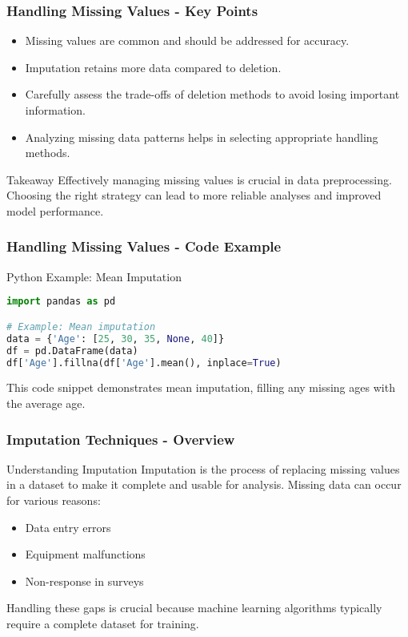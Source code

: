 \documentclass[aspectratio=169]{beamer}
\begin{document}
\begin{frame}[fragile]
    \frametitle{Handling Missing Values - Key Points}
    \begin{itemize}
        \item Missing values are common and should be addressed for accuracy.
        \item Imputation retains more data compared to deletion.
        \item Carefully assess the trade-offs of deletion methods to avoid losing important information.
        \item Analyzing missing data patterns helps in selecting appropriate handling methods.
    \end{itemize}
    
    \begin{block}{Takeaway}
        Effectively managing missing values is crucial in data preprocessing. Choosing the right strategy can lead to more reliable analyses and improved model performance.
    \end{block}
\end{frame}

\begin{frame}[fragile]
    \frametitle{Handling Missing Values - Code Example}
    \begin{block}{Python Example: Mean Imputation}
        \begin{lstlisting}[language=Python]
import pandas as pd

# Example: Mean imputation
data = {'Age': [25, 30, 35, None, 40]}
df = pd.DataFrame(data)
df['Age'].fillna(df['Age'].mean(), inplace=True)
        \end{lstlisting}
        This code snippet demonstrates mean imputation, filling any missing ages with the average age.
    \end{block}
\end{frame}

\begin{frame}[fragile]
    \frametitle{Imputation Techniques - Overview}
    \begin{block}{Understanding Imputation}
        Imputation is the process of replacing missing values in a dataset to make it complete and usable for analysis. Missing data can occur for various reasons:
        \begin{itemize}
            \item Data entry errors
            \item Equipment malfunctions
            \item Non-response in surveys
        \end{itemize}
        Handling these gaps is crucial because machine learning algorithms typically require a complete dataset for training.
    \end{block}
\end{frame}
\end{document}
